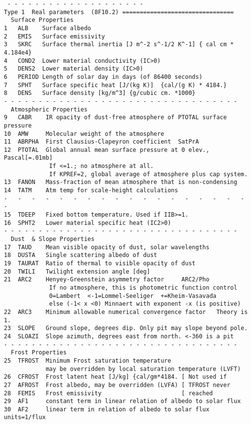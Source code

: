 \documentclass{article}
\begin{document}
\begin{verbatim} 
 - - - - - - - - - - - - - - - - - - - -
Type 1	Real parameters  (8F10.2) ================================
  Surface Properties
1   ALB    Surface albedo
2   EMIS   Surface emissivity
3   SKRC   Surface thermal inertia [J m^-2 s^-1/2 K^-1] { cal cm * 4.184e4}
4   COND2  Lower material conductivity (IC>0)
5   DENS2  Lower material density (IC>0)
6   PERIOD Length of solar day in days (of 86400 seconds)
7   SPHT   Surface specific heat [J/(kg K)]  {cal/(g K) * 4184.}
8   DENS   Surface density [kg/m^3] {g/cubic cm. *1000}
- - - - - - - - - - - - - - - - - - - - - - - - - - - - - - - - - - 
  Atmospheric Properties
9   CABR    IR opacity of dust-free atmosphere of PTOTAL surface pressure
10  AMW     Molecular weight of the atmosphere
11  ABRPHA  First Clausius-Clapeyron coefficient  SatPrA 
12  PTOTAL  Global annual mean surface pressure at 0 elev., Pascal[=.01mb]
             If <=1.; no atmosphere at all.
             If KPREF=2, global average of atmosphere plus cap system.
13  FANON   Mass-fraction of mean atmosphere that is non-condensing
14  TATM    Atm temp for scale-height calculations
-   -   -   -   -   -   -   -   -   -   -   -   -   -   -   -   -   -   -   
15  TDEEP   Fixed bottom temperature. Used if IIB>=1.
16  SPHT2   Lower material specific heat (IC2>0)
- - - - - - - - - - - - - - - - - - - - - - - - - - - - - - - - - - 
  Dust  & Slope Properties
17  TAUD    Mean visible opacity of dust, solar wavelengths
18  DUSTA   Single scattering albedo of dust
19  TAURAT  Ratio of thermal to visible opacity of dust
20  TWILI   Twilight extension angle [deg]
21  ARC2    Henyey-Greenstein asymmetry factor     ARC2/Pho
             If no atmosphere, this is photometric function control
             0=Lambert  <-1=Lommel-Seeliger  +=Kheim-Vasavada
             else (-1< x <0) Minnaert with exponent -x (is positive)
22  ARC3    Minimum allowable numerical convergence factor   Theory is 1.
23  SLOPE   Ground slope, degrees dip. Only pit may slope beyond pole.
24  SLOAZI  Slope azimuth, degrees east from north. <-360 is a pit
- - - - - - - - - - - - - - - - - - - - - - - - - - - - - - - - - - 
  Frost Properties
25  TFROST  Minimum Frost saturation temperature
            may be overridden by local saturation temperature (LVFT)
26  CFROST  Frost latent heat [J/kg] {cal/gm*4184. [ Not used if
27  AFROST  Frost albedo, may be overridden (LVFA) [ TFROST never
28  FEMIS   Frost emissivity                       [ reached
29  AF1     constant term in linear relation of albedo to solar flux
30  AF2     linear term in relation of albedo to solar flux units=1/flux

\end{verbatim}
\end{document}
